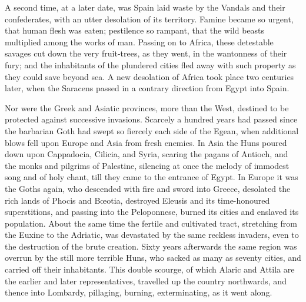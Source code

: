 A second time, at a later date, was Spain laid waste by the Vandals
and their confederates, with an utter desolation of its territory.
Famine became so urgent, that human flesh was eaten; pestilence so
rampant, that the wild beasts multiplied among the works of man.
Passing on to Africa, these detestable savages cut down the very
fruit-trees, as they went, in the wantonness of their fury; and the
inhabitants of the plundered cities fled away with such property as
they could save beyond sea. A new desolation of Africa took place two
centuries later, when the Saracens passed in a contrary direction from
Egypt into Spain.

Nor were the Greek and Asiatic provinces, more than the West,
destined to be protected against successive invasions. Scarcely a
hundred years had passed since the barbarian Goth had swept so
fiercely each side of the Egean, when additional blows fell upon
Europe and Asia from fresh enemies. In Asia the Huns poured down upon
Cappadocia, Cilicia, and Syria, scaring the pagans of Antioch, and the
monks and pilgrims of Palestine, silencing at once the melody of
immodest song and of holy chant, till they came to the entrance of
Egypt. In Europe it was the Goths again, who descended with fire and
sword into Greece, desolated the rich lands of Phocis and Bœotia,
destroyed Eleusis and its time-honoured superstitions, and passing
into the Peloponnese, burned its cities and enslaved its population.
About the same time the fertile and cultivated tract, stretching from
the Euxine to the Adriatic, was devastated by the same reckless
invaders, even to the destruction of the brute creation. Sixty years
afterwards the same region was overrun by the still more terrible
Huns, who sacked as many as seventy cities, and carried off their
inhabitants. This double scourge, of which Alaric and Attila are the
earlier and later representatives, travelled up the country
northwards, and thence into Lombardy, pillaging, burning,
exterminating, as it went along.

